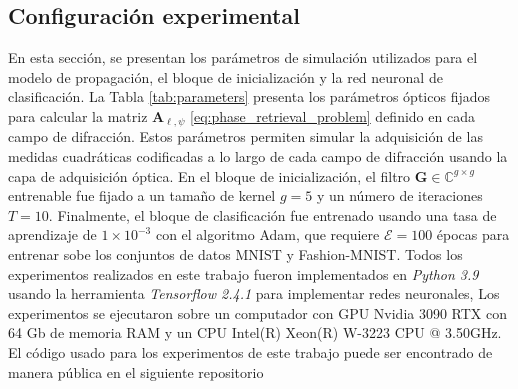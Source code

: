 \subsection{Configuración experimental}

En esta sección, se presentan los parámetros de simulación utilizados para el modelo de propagación, el bloque de inicialización y la red neuronal de clasificación. La Tabla \ref{tab:parameters} presenta los parámetros ópticos fijados para calcular la matriz $\mathbf{A}_{\ell,\psi}$ \eqref{eq:phase_retrieval_problem} definido en cada campo de difracción. Estos parámetros permiten simular la adquisición de las medidas cuadráticas codificadas a lo largo de cada campo de difracción usando la capa de adquisición óptica. En el bloque de inicialización, el filtro $\mathbf{G} \in \mathbb{C}^{g\times g}$ entrenable fue fijado a un tamaño de kernel $g=5$ y un número de iteraciones $T=10$. Finalmente, el bloque de clasificación fue entrenado usando una tasa de aprendizaje de $1\times 10^{-3}$ con el algoritmo Adam, que requiere $\mathcal{E}=100$ épocas para entrenar sobe los conjuntos de datos MNIST y Fashion-MNIST. Todos los experimentos realizados en este trabajo fueron implementados en \textit{Python 3.9} usando la herramienta \textit{Tensorflow 2.4.1}   para implementar redes neuronales, Los experimentos se ejecutaron sobre un computador con GPU Nvidia 3090 RTX con 64 Gb de memoria RAM y un CPU Intel(R) Xeon(R) W-3223 CPU @ 3.50GHz. El código usado para los experimentos de este trabajo puede ser encontrado de manera pública en el siguiente repositorio 

\begin{table}[!h]
\centering{}

\caption{ Parámetros de propagación usados para simular el modelo de propagación de la ecuación \eqref{eq:phase_retrieval_problem} para cada campo de difracción.}\label{tab:parameters}
\end{table}


